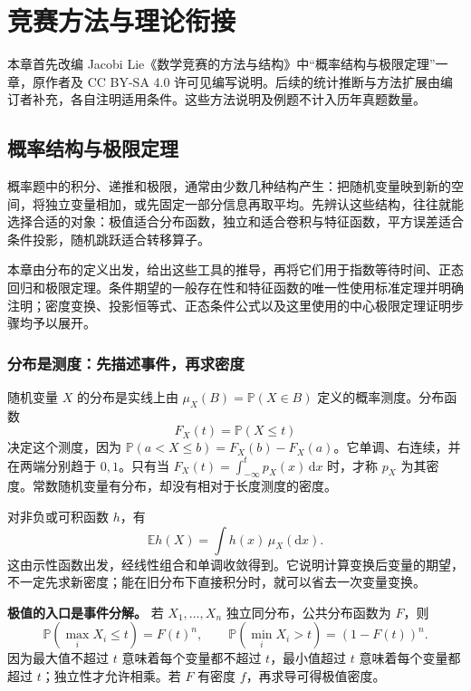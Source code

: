 \setcounter{chapter}{2} %
\chapter{竞赛方法与理论衔接}
本章首先改编 Jacobi Lie《数学竞赛的方法与结构》中“概率结构与极限定理”一章，原作者及 CC BY-SA 4.0 许可见编写说明。后续的统计推断与方法扩展由编订者补充，各自注明适用条件。这些方法说明及例题不计入历年真题数量。




\section{概率结构与极限定理}

概率题中的积分、递推和极限，通常由少数几种结构产生：把随机变量映到新的空间，将独立变量相加，或先固定一部分信息再取平均。先辨认这些结构，往往就能选择合适的对象：极值适合分布函数，独立和适合卷积与特征函数，平方误差适合条件投影，随机跳跃适合转移算子。

本章由分布的定义出发，给出这些工具的推导，再将它们用于指数等待时间、正态回归和极限定理。条件期望的一般存在性和特征函数的唯一性使用标准定理并明确注明；密度变换、投影恒等式、正态条件公式以及这里使用的中心极限定理证明步骤均予以展开。

\subsection{分布是测度：先描述事件，再求密度}

\label{app:probability-law}

随机变量 $X$ 的分布是实线上由 $\mu_X(B)=\mathbb P(X\in B)$ 定义的概率测度。分布函数
\[
F_X(t)=\mathbb P(X\le t)
\]
决定这个测度，因为 $\mathbb P(a<X\le b)=F_X(b)-F_X(a)$。它单调、右连续，并在两端分别趋于 $0,1$。只有当 $F_X(t)=\int_{-\infty}^tp_X(x)\,\mathrm dx$ 时，才称 $p_X$ 为其密度。常数随机变量有分布，却没有相对于长度测度的密度。

对非负或可积函数 $h$，有
\[
\mathbb Eh(X)=\int h(x)\,\mu_X(\mathrm dx).
\]
这由示性函数出发，经线性组合和单调收敛得到。它说明计算变换后变量的期望，不一定先求新密度；能在旧分布下直接积分时，就可以省去一次变量变换。

\textbf{极值的入口是事件分解。} 若 $X_1,\ldots,X_n$ 独立同分布，公共分布函数为 $F$，则
\[
\mathbb P\!\left(\max_iX_i\le t\right)=F(t)^n,
\qquad
\mathbb P\!\left(\min_iX_i>t\right)=(1-F(t))^n.
\]
因为最大值不超过 $t$ 意味着每个变量都不超过 $t$，最小值超过 $t$ 意味着每个变量都超过 $t$；独立性才允许相乘。若 $F$ 有密度 $f$，再求导可得极值密度。

